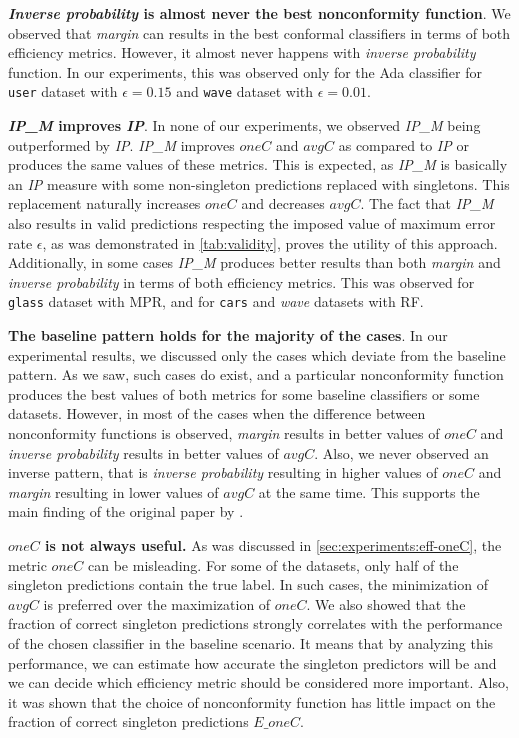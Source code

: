      \textbf{\textit{Inverse probability} is almost never the best nonconformity function}.
    We observed that \textit{margin} can results in the best conformal classifiers in terms of both efficiency metrics. 
    However, it almost never happens with \textit{inverse probability} function.
    In our experiments, this was observed only for the Ada classifier for \verb|user| dataset with $\epsilon = 0.15$ and \verb|wave| dataset with $\epsilon = 0.01$.
    
     \textbf{\textit{IP\_M} improves \textit{IP}}. In none of our experiments, we  observed \textit{IP\_M} being outperformed by \textit{IP}.
    \textit{IP\_M} improves $oneC$ and $avgC$ as compared to \textit{IP} or produces the same values of these metrics.
    This is expected, as \textit{IP\_M} is basically an \textit{IP} measure with some non-singleton predictions replaced with singletons.
    This replacement naturally increases $oneC$ and decreases $avgC$.
    The fact that \textit{IP\_M} also results in valid predictions respecting the imposed value of maximum error rate $\epsilon$, as was demonstrated in \cref{tab:validity}, proves the utility of this approach.
    Additionally, in some cases \textit{IP\_M} produces better results than both \textit{margin} and \textit{inverse probability} in terms of both efficiency metrics.
    This was observed for \verb|glass| dataset with MPR, and for \verb|cars| and \textit{wave} datasets with RF.
    
    \textbf{The baseline pattern holds for the majority of the cases}. 
    In our experimental results, we discussed only the cases which deviate from the baseline pattern.
    As we saw, such cases do exist, and a
    particular nonconformity function produces the best values of both metrics for some baseline classifiers or some datasets. 
    However, in most of the cases when the difference between nonconformity functions is observed,
    \textit{margin} results in better values of $oneC$ and \textit{inverse probability} results in 
    better values of $avgC$.
    Also, we never observed an inverse pattern, that is \textit{inverse probability} resulting in 
    higher values of $oneC$ and \textit{margin} resulting in lower values of $avgC$ at the same 
    time.
    This supports the main finding of the original paper by \citet{johansson2017model}.
    
    \textbf{$oneC$ is not always useful.}
    As was discussed in \cref{sec:experiments:eff-oneC}, the metric $oneC$ can be misleading.
    For some of the datasets, only half of the singleton predictions contain the true label.
    In such cases, the minimization of $avgC$ is preferred over the maximization of $oneC$.
    We also showed that the fraction of correct singleton predictions strongly correlates with the 
    performance of the chosen classifier in the baseline scenario.
    It means that by analyzing this performance, we can estimate how accurate the singleton 
    predictors will be and we can decide which efficiency metric should be considered more important.
    Also, it was shown that the choice of nonconformity function has little impact on 
    the fraction of correct singleton predictions $E\_oneC$.
    

